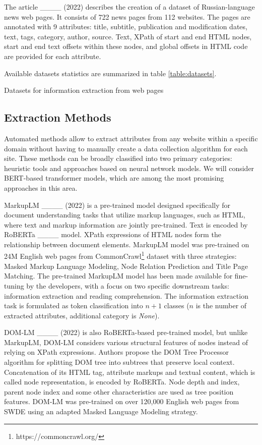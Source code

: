 The article ____ (2022) describes the creation of a dataset of Russian-language news web pages. It consists of 722 news pages from 112 websites. The pages are annotated with 9 attributes: title, subtitle, publication and modification dates, text, tags, category, author, source. Text, XPath of start and end HTML nodes, start and end text offsets within these nodes, and global offsets in HTML code are provided for each attribute.

Available datasets statistics are summarized in table \ref{table:datasets}.

\begin{table}[ht!]
    \caption{Datasets for information extraction from web pages}
    \begin{center}
    
    \end{center}
    \label{table:datasets}
\end{table}

\subsection{Extraction Methods}
Automated methods allow to extract attributes from any website within a specific domain without having to manually create a data collection algorithm for each site. These methods can be broadly classified into two primary categories: heuristic tools and approaches based on neural network models. We will consider BERT-based transformer models, which are among the most promising approaches in this area.

MarkupLM ____ (2022) is a pre-trained model designed specifically for document understanding tasks that utilize markup languages, such as HTML, where text and markup information are jointly pre-trained. Text is encoded by RoBERTa ____ model. XPath expressions of HTML nodes form the relationship between document elements. MarkupLM model was pre-trained on 24M English web pages from CommonCrawl\footnote{https://commoncrawl.org/} dataset with three strategies: Masked Markup Language Modeling, Node Relation Prediction and Title Page Matching. The pre-trained MarkupLM model has been made available for fine-tuning by the developers, with a focus on two specific downstream tasks: information extraction and reading comprehension. The information extraction task is formulated as token classification into $n+1$ classes ($n$ is the number of extracted attributes, additional category is \textit{None}). 

DOM-LM ____ (2022) is also RoBERTa-based pre-trained model, but unlike MarkupLM, DOM-LM considers various structural features of nodes instead of relying on XPath expressions. Authors propose the DOM Tree Processor algorithm for splitting DOM tree into subtrees that preserve local context. Concatenation of its HTML tag, attribute markups and textual content, which is called node representation, is encoded by RoBERTa. Node depth and index, parent node index and some other characteristics are used as tree position features. DOM-LM was pre-trained on over 120,000 English web pages from SWDE using an adapted Masked Language Modeling strategy.

